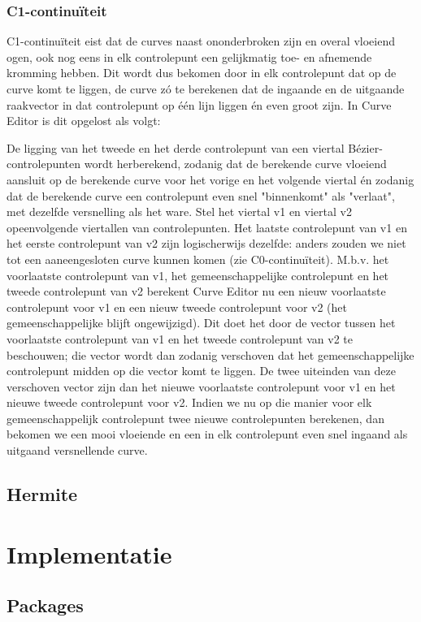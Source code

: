 \documentclass[a4paper,11pt,oneside, titlepage]{article}
\begin{document}
\subsubsection{C1-continu\"iteit}
C1-continu\"iteit eist dat de curves naast ononderbroken zijn en overal vloeiend ogen, ook nog eens in elk controlepunt een gelijkmatig toe- en afnemende kromming hebben. Dit wordt dus bekomen door in elk controlepunt dat op de curve komt te liggen, de curve z\'o te berekenen dat de ingaande en de uitgaande raakvector
in dat controlepunt op \'e\'en lijn liggen \'en even groot zijn. In Curve Editor is dit opgelost als volgt:

De ligging van het tweede en het derde controlepunt van een viertal B\'ezier-controlepunten wordt herberekend, zodanig dat de berekende curve vloeiend aansluit op de berekende curve voor het vorige en het volgende viertal \'en zodanig dat de berekende curve een controlepunt even snel "binnenkomt" als "verlaat", met dezelfde versnelling als het ware. Stel het viertal v1 en viertal v2 opeenvolgende viertallen van controlepunten. Het laatste controlepunt van v1 en het eerste controlepunt van v2 zijn logischerwijs dezelfde: anders zouden we niet tot een aaneengesloten curve kunnen komen (zie C0-continu\"iteit). M.b.v. het voorlaatste controlepunt van v1, het gemeenschappelijke controlepunt en het tweede controlepunt van v2 berekent Curve Editor nu een nieuw voorlaatste controlepunt voor v1 en een nieuw tweede controlepunt voor v2 (het gemeenschappelijke blijft ongewijzigd). Dit doet het door de vector tussen het voorlaatste controlepunt van v1 en het tweede controlepunt van v2 te beschouwen; die vector wordt dan zodanig verschoven dat het gemeenschappelijke controlepunt midden op die vector komt te liggen. De twee uiteinden van deze verschoven vector zijn dan het nieuwe voorlaatste controlepunt voor v1 en het nieuwe tweede controlepunt voor v2. Indien we nu op die manier voor elk gemeenschappelijk controlepunt twee nieuwe controlepunten berekenen, dan bekomen we een mooi vloeiende en een in elk controlepunt even snel ingaand als uitgaand versnellende curve.
\subsection{Hermite}
\newpage
\section{Implementatie}
\subsection{Packages}
\end{document}

